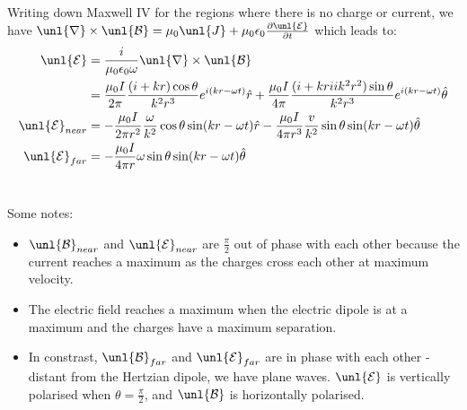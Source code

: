 \documentclass[a4paper, 11pt, normalem]{report}
\newcommand\p{\partial}
\newcommand\E{\mathcal{E}}
\newcommand\uE{\unl{\E}}
\newcommand\B{\mathcal{B}}
\newcommand\uB{\unl{\B}}
\newcommand\del{\unl{\nabla}}
\newcommand\eno{\epsilon_0}
\newcommand\hr{\hat{r}}
\newcommand\om{\omega}
\newcommand\J{\unl{J}}
\begin{document}
Writing down Maxwell \RN{4} for the regions where there is no charge or current, we have $\del\times\uB = \mu_0\J + \mu_0\eno\frac{\p\uE}{\p t}$ which leads to:
\begin{align}
	\uE &= \frac{i}{\mu_0\eno\om}\del\times\uB \\
	&= \frac{\mu_0I}{2\pi}\frac{(i + kr)\cos\theta}{k^2r^3}e^{i(kr - \om t)}\hr + \frac{\mu_0I}{4\pi}\frac{(i+kriik^2r^2)\sin\theta}{k^2r^3}e^{i(kr - \om t)}\hat{\theta} \\
	\uE_{near} &= -\frac{\mu_0I}{2\pi r^2}\frac{\om}{k^2}\cos\theta\sin(kr - \om t)\hr - \frac{\mu_0I}{4\pi r^3}\frac{v}{k^2}\sin\theta\sin(kr - \om t)\hat{\theta} \\
	\uE_{far} &= -\frac{\mu_0I}{4\pi r}\om\sin\theta\sin(kr - \om t)\hat{\theta}
\end{align}

\chapter{}
Some notes:
\begin{itemize}
	\item $\uB_{near}$ and $\uE_{near}$ are $\frac{\pi}{2}$ out of phase with each other because the current reaches a maximum as the charges cross each other at maximum velocity.
	\item The electric field reaches a maximum when the electric dipole is at a maximum and the charges have a maximum separation.
	\item In constrast, $\uB_{far}$ and $\uE_{far}$ are in phase with each other - distant from the Hertzian dipole, we have plane waves. $\uE$ is vertically polarised when $\theta = \frac{\pi}{2}$, and $\uB$ is horizontally polarised.
\end{itemize}
\end{document}
